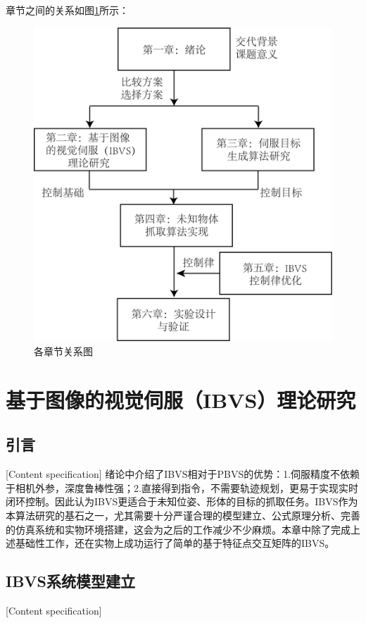 \documentclass[fontset=fandol,type=bachelor,campus=harbin]{hithesisbook}
\begin{document}
章节之间的关系如图\ref{章节流程图}所示：
\begin{figure}[h]
\centering
\includegraphics[scale=1.0]{chapter1/章节流程图}
\caption{各章节关系图}
\label{章节流程图}
\end{figure}


\chapter[基于图像的视觉伺服（IBVS）理论研究]{基于图像的视觉伺服（IBVS）理论研究}
\section{引言}[Content specification]
绪论中介绍了IBVS相对于PBVS的优势：1.伺服精度不依赖于相机外参，深度鲁棒性强；2.直接得到指令，不需要轨迹规划，更易于实现实时闭环控制。因此认为IBVS更适合于未知位姿、形体的目标的抓取任务。IBVS作为本算法研究的基石之一，尤其需要十分严谨合理的模型建立、公式原理分析、完善的仿真系统和实物环境搭建，这会为之后的工作减少不少麻烦。本章中除了完成上述基础性工作，还在实物上成功运行了简单的基于特征点交互矩阵的IBVS。

\section{IBVS系统模型建立}[Content specification]
\end{document}
